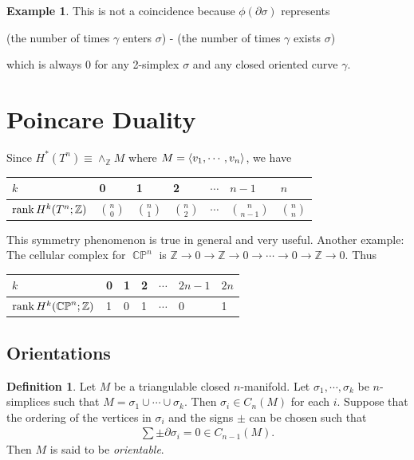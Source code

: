 \documentclass[psamsfonts]{amsart}
\theoremstyle{definition}
\newtheorem{defn}[thm]{Definition}
\newtheorem{exmp}[thm]{Example}
\theoremstyle{rem}
\DeclareMathOperator{\CP}{\mathbb{C}\mathbb{P}}
\numberwithin{equation}{section}
\begin{document}
\begin{exmp}
  This is not a coincidence because $\phi(\partial\sigma)$ represents 
  \begin{center}
    (the number of times $\gamma$ enters $\sigma$) - (the number of times $\gamma$ exists $\sigma$)
  \end{center}
  which is always 0 for any 2-simplex $\sigma$ and any closed oriented curve $\gamma$.
\end{exmp}

\section{Poincare Duality}

Since $H^{\ast}(T^n) \equiv \wedge_{\mathbb{Z}} M$ where $M = \ev{ v_1, \cdots, v_n }$, we have

\begin{center}
  \begin{tabular}{| l | l | l | l | l | l | l |} \hline
    $k$                          & 0 & 1 & 2 & $\cdots$ & $n - 1$  & $n$ \\ \hline
    $\rank H^k(T^n; \mathbb{Z})$ & $\binom{n}{0}$ & $\binom{n}{1}$ & $\binom{n}{2}$ & $\cdots$ & $\binom{n}{n - 1}$ & $\binom{n}{n}$ \\ \hline
  \end{tabular}
\end{center}

This symmetry phenomenon is true in general and very useful.
Another example: The cellular complex for $\CP^n$ is $\mathbb{Z} \rightarrow 0 \rightarrow \mathbb{Z} \rightarrow 0 \rightarrow \cdots \rightarrow 0 \rightarrow \mathbb{Z} \rightarrow 0$.
Thus

\begin{center}
  \begin{tabular}{| l | l | l | l | l | l | l |} \hline
    $k$                          & 0 & 1 & 2 & $\cdots$ & $2n - 1$  & $2n$ \\ \hline
    $\rank H^k(\CP^n; \mathbb{Z})$ & 1 & 0 & 1 & $\cdots$ & 0         & 1 \\
    \hline
  \end{tabular}
\end{center}

\subsection{Orientations}

\begin{defn}
  Let $M$ be a triangulable closed $n$-manifold.
  Let $\sigma_1, \cdots, \sigma_k$ be $n$-simplices such that $M = \sigma_1 \cup \cdots \cup \sigma_k$.
  Then $\sigma_i \in C_n(M)$ for each $i$.
  Suppose that the ordering of the vertices in $\sigma_i$ and the signs $\pm$ can be chosen such that
  \begin{align*}
    \sum \pm \partial \sigma_i = 0 \in C_{n - 1}(M).
  \end{align*}
  Then $M$ is said to be \textit{orientable}.
\end{defn}
\end{document}
